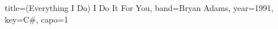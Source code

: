\documentclass{../../tex/bekki-leadsheet}
\begin{document}
\begin{song}[transpose-capo=true]{title={(Everything I Do) I Do It For You}, band={Bryan Adams}, year={1991}, key={C#}, capo={1}}

  

\end{song}
\end{document}
